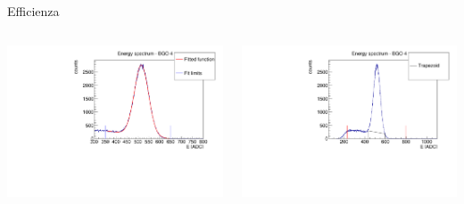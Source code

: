 \documentclass [xcolor=svgnames, 9pt] {beamer}
\begin{document}
\begin{frame}{Efficienza}
		\begin{columns}
			\begin{column}{0.5\textwidth}
				\includegraphics[width=\textwidth]{img/parameter.pdf}
			\end{column}
			\begin{column}{0.5\textwidth}
				\includegraphics[width=\textwidth]{img/trapezoid.pdf}
			\end{column}
		\end{columns}
\end{frame}
\end{document}
